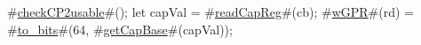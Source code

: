#\hyperref[sailMIPSzcheckCP2usable]{checkCP2usable}#();
let capVal = #\hyperref[sailMIPSzreadCapReg]{readCapReg}#(cb);
#\hyperref[sailMIPSzwGPR]{wGPR}#(rd) = #\hyperref[sailMIPSztozybits]{to\_bits}#(64, #\hyperref[sailMIPSzgetCapBase]{getCapBase}#(capVal));
